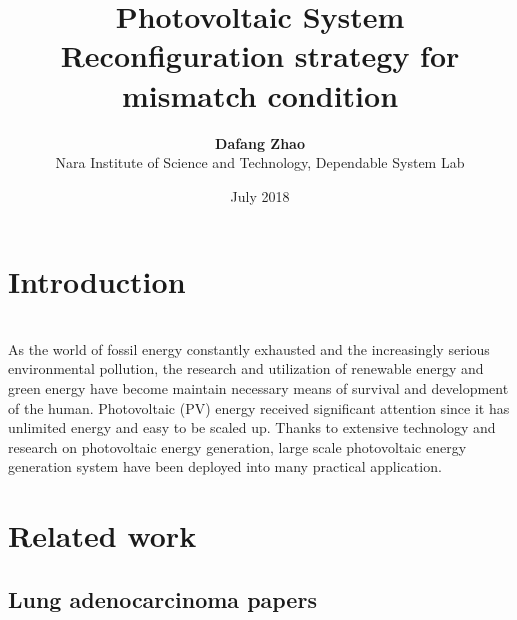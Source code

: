 \documentclass[twocolumn,12pt]{article}
\title{\textbf{Photovoltaic System Reconfiguration strategy for mismatch condition}}%
\date{July 2018}
\author{\textbf{Dafang Zhao}\\Nara Institute of Science and Technology, Dependable System Lab}
\begin{document}
\maketitle

\section{Introduction}
\\As the world of fossil energy constantly exhausted and the increasingly serious environmental pollution, the research and utilization of renewable energy and green energy have become maintain necessary means of survival and development of the human. Photovoltaic (PV) energy received significant attention since it has unlimited energy and easy to be scaled up. Thanks to extensive technology and research on photovoltaic energy generation, large scale photovoltaic energy generation system have been deployed into many practical application.
\section{Related work}
\subsection{Lung adenocarcinoma papers}
\end{document}
